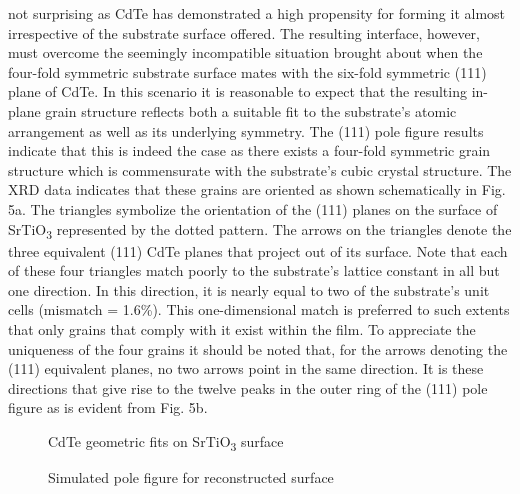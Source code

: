 not surprising as CdTe has demonstrated a high propensity for
forming it almost irrespective of the substrate surface offered\cite{Neretina2006}.
The resulting interface, however, must overcome the seemingly
incompatible situation brought about when the four-fold symmetric substrate surface mates with the six-fold symmetric (111)
plane of CdTe. In this scenario it is reasonable to expect that the
resulting in-plane grain structure reflects both a suitable fit to the
substrate’s atomic arrangement as well as its underlying symmetry. The (111) pole figure results indicate that this is indeed the
case as there exists a four-fold symmetric grain structure which is
commensurate with the substrate’s cubic crystal structure. The
XRD data indicates that these grains are oriented as shown
schematically in Fig. 5a. The triangles symbolize the orientation of
the (111) planes on the surface of SrTiO\textsubscript{3} represented by the
dotted pattern. The arrows on the triangles denote the three
equivalent (111) CdTe planes that project out of its surface. Note
that each of these four triangles match poorly to the substrate’s
lattice constant in all but one direction. In this direction, it is nearly
equal to two of the substrate’s unit cells (mismatch = 1.6\%). This
one-dimensional match is preferred to such extents that only
grains that comply with it exist within the film. To appreciate the
uniqueness of the four grains it should be noted that, for the arrows
denoting the (111) equivalent planes, no two arrows point in the
same direction. It is these directions that give rise to the twelve
peaks in the outer ring of the (111) pole figure as is evident from
Fig. 5b.
\begin{figure}
    \centering
    \caption{\label{fig:srtio3_tri_on_100}CdTe geometric fits on SrTiO\textsubscript{3} surface}
\end{figure}
\begin{figure}
    \centering
    \caption{\label{fig:srtio3_sim_polefigure} Simulated pole figure for reconstructed surface}
\end{figure}

